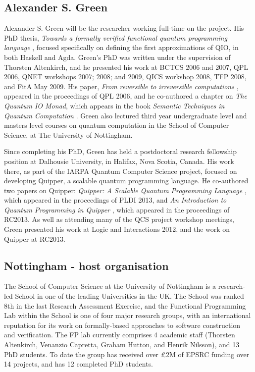 \documentclass[a4paper]{article}
\begin{document}
\subsection*{Alexander S. Green}
Alexander S. Green will be the researcher working full-time on the
project. His PhD thesis, \emph{Towards a formally verified functional
  quantum programming language} , focused
specifically on defining the first approximations of QIO, in both
Haskell and Agda. Green's PhD was written under the supervision of
Thorsten Altenkirch, and he presented his work at BCTCS 2006
and 2007, QPL 2006, QNET workshops 2007; 2008; and 2009, QICS workshop
2008, TFP 2008, and FitA May 2009. His paper, \emph{From reversible to
irreversible computations} , appeared in the
proceedings of QPL 2006, and he co-authored a chapter on \emph{The
Quantum IO Monad}, which appears in the book \emph{Semantic Techniques
in Quantum Computation} . Green also lectured third
year undergraduate level and masters level courses on quantum
computation in the School of Computer Science, at The University of
Nottingham. 

Since completing his PhD, Green has held a postdoctoral research
fellowship position at Dalhousie University, in Halifax, Nova Scotia,
Canada. His work there, as part of the IARPA Quantum Computer Science
project, focused on developing Quipper, a scalable quantum programming
language. He co-authored two papers on Quipper: \emph{Quipper: A
  Scalable Quantum Programming Language} ,
which appeared in the proceedings of PLDI 2013, and \emph{An
  Introduction to Quantum Programming in Quipper}
, which appeared in the proceedings of
RC2013. As well as attending many of the QCS project workshop
meetings, Green presented his work at Logic and Interactions 2012, and
the work on Quipper at RC2013. 


\subsection*{Nottingham - host organisation}

The School of Computer Science at the University of Nottingham
is a research-led School in one of the leading Universities in
the UK.	 The School was ranked 8th in the last Research Assessment
Exercise, and the Functional Programming Lab within the School is
one of four major research groups, with an international reputation
for its work on formally-based approaches to software construction
and verification.  The FP lab currently comprises 4 academic staff
(Thorsten Altenkirch, Venanzio Capretta, Graham Hutton, and Henrik
Nilsson), and 13 PhD students.  To date the
group has received over \pounds 2M of EPSRC funding over 14 projects,
and has 12 completed PhD students.
\end{document}
